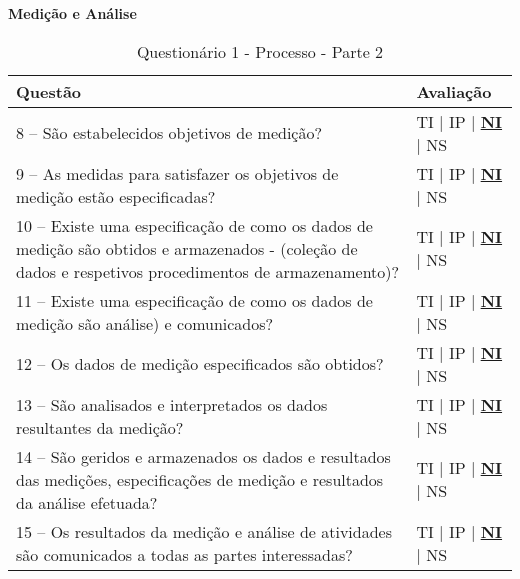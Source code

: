 \documentclass[openany,10pt,a4paper]{article}
\begin{document}
\begin{appendix}
	\begin{table}[h]
	\textbf{Medição e Análise}
		\centering
		\caption{Questionário 1 - Processo - Parte 2}
		\begin{tabular}{p{5in}p{1in}}		
			\toprule
		
			\textbf{Questão}  & \textbf{Avaliação}\\ 
			\midrule
			8 – São estabelecidos objetivos de medição?
	 & TI | IP | \underline{\textbf{NI}} | NS \\
			\midrule
			9 – As medidas para satisfazer os objetivos de medição estão especificadas?
	 & TI | IP | \underline{\textbf{NI}} | NS \\
			\midrule
			10 – Existe uma especificação de como os dados de medição são obtidos e armazenados - 
	(coleção de dados e respetivos procedimentos de armazenamento)?
	 & TI | IP | \underline{\textbf{NI}} | NS \\
			\midrule
			11 – Existe uma especificação de como os dados de medição são análise) e comunicados?
	 & TI | IP | \underline{\textbf{NI}} | NS \\
			\midrule
			12 – Os dados de medição especificados são obtidos?
	  & TI | IP | \underline{\textbf{NI}} | NS \\
			\midrule
			13 – São analisados e interpretados os dados resultantes da medição?
	 & TI | IP | \underline{\textbf{NI}} | NS \\
			\midrule
			14 – São geridos e armazenados os dados e resultados das medições, especificações de medição 
	e resultados da análise efetuada?
	 & TI | IP | \underline{\textbf{NI}} | NS \\
			\midrule
			15 – Os resultados da medição e análise de atividades são comunicados a todas as partes
	interessadas?
	 & TI | IP | \underline{\textbf{NI}} | NS \\
			\bottomrule
		\end{tabular} 
	\end{table}
	

\end{appendix}
\end{document}
